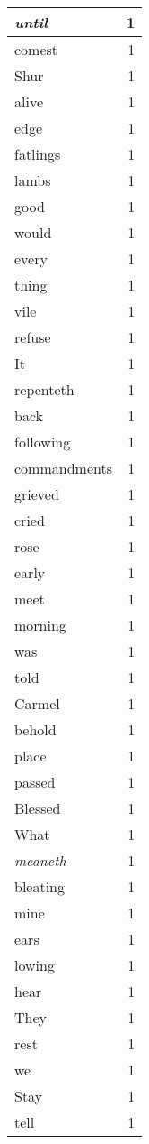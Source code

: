 \begin{center}
\begin{longtable}{l|r}
\emph{until} & 1 \\ \hline
comest & 1 \\ \hline
Shur & 1 \\ \hline
alive & 1 \\ \hline
edge & 1 \\ \hline
fatlings & 1 \\ \hline
lambs & 1 \\ \hline
good & 1 \\ \hline
would & 1 \\ \hline
every & 1 \\ \hline
thing & 1 \\ \hline
vile & 1 \\ \hline
refuse & 1 \\ \hline
It & 1 \\ \hline
repenteth & 1 \\ \hline
back & 1 \\ \hline
following & 1 \\ \hline
commandments & 1 \\ \hline
grieved & 1 \\ \hline
cried & 1 \\ \hline
rose & 1 \\ \hline
early & 1 \\ \hline
meet & 1 \\ \hline
morning & 1 \\ \hline
was & 1 \\ \hline
told & 1 \\ \hline
Carmel & 1 \\ \hline
behold & 1 \\ \hline
place & 1 \\ \hline
passed & 1 \\ \hline
Blessed & 1 \\ \hline
What & 1 \\ \hline
\emph{meaneth} & 1 \\ \hline
bleating & 1 \\ \hline
mine & 1 \\ \hline
ears & 1 \\ \hline
lowing & 1 \\ \hline
hear & 1 \\ \hline
They & 1 \\ \hline
rest & 1 \\ \hline
we & 1 \\ \hline
Stay & 1 \\ \hline
tell & 1 \\ \hline

\end{longtable}
\end{center}
